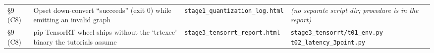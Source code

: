 \documentclass[11pt]{article}
\begin{document}
\begin{longtable}{L{0.9cm} L{4.0cm} L{4.3cm} L{5.0cm}}
\addlinespace[2pt]
\S9 (C8) & Opset down-convert ``succeeds'' (exit 0) while emitting an invalid graph & \texttt{stage1\_\allowbreak quantization\_\allowbreak log.html} & \emph{(no separate script dir; procedure is in the report)} \\
\addlinespace[2pt]
\S9 (C8) & pip TensorRT wheel ships without the `trtexec' binary the tutorials assume & \texttt{stage3\_\allowbreak tensorrt\_\allowbreak report.html} & \texttt{stage3\_\allowbreak tensorrt/\allowbreak t01\_\allowbreak env.py} \newline \texttt{t02\_\allowbreak latency\_\allowbreak 3point.py} \\
\end{longtable}
\endgroup
\end{document}
